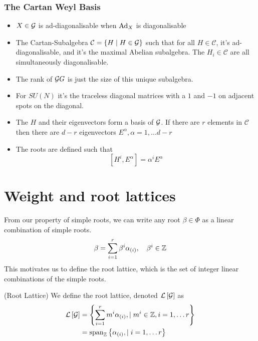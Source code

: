 \subsubsection{The Cartan Weyl Basis}
\begin{itemize}
	\item $ X \in \mathcal{ G } $ is ad-diagonalisable 
		when $ \text{Ad}_{ X } $ is diagonalisable 
	\item The Cartan-Subalgebra $ \mathcal{ C }  =  \left\{  H \mid H \in \mathcal{ G }   \right\} $ 
		such that for all $ H \in \mathcal{ C } $, it's ad-diagonalisable, and 
		it's the maximal Abelian subalgebra. The $ H _ i \in \mathcal{ C } $ 
		are all simultaneously diagonalisable. 
	\item The rank of $ \mathcal{ G } G $ is just the size of this unique subalgebra. 
	\item For $ SU \left(  N  \right)  $ it's the traceless diagonal matrices 
		with a $ 1 $ and $ -1 $ on adjacent spots on the diagonal.
	\item The $ H $ and their eigenvectors form a basis of $ \mathcal{ G } $. If there 
		are $ r $ elements in $ \mathcal{ C } $ then there 
		are $ d  - r $  eigenvectors $ E ^{ \alpha } , \alpha =  1, \dots d - r $
	\item The roots are defined such that 
		\[
			\left[  H ^{ i } , E ^{ \alpha }   \right]   = \alpha ^ i E ^{ \alpha } 
		\] 

\end{itemize}

 \pagebreak
\section{Weight and root lattices} 
From our property of simple roots, we can write any 
root $ \beta \in \Phi  $ as a linear combination of 
simple roots. 
\[
	\beta = \sum _{ i = 1 } ^ r \beta ^ i \alpha _{ \left( i  \right)  } , \quad 
	\beta ^ i \in \mathbb{Z} 
\] This motivates us to define the root lattice, 
which is the set of integer linear combinations of the 
simple roots. 
\begin{defn}{(Root Lattice)}
	We define the root lattice, denoted $ \mathcal{ L } \left[  \mathcal{ G }  \right]  $
	as 
	\begin{align*}
	 \mathcal{ L } \left[  \mathcal{ G }  \right] &=  \left\{  \sum_{ i= 1 } ^ r 
	 m ^ i \alpha _{ \left( i  \right)  } , \mid m ^ i \in \mathbb{Z} , i = 1 , \dots r \right\}   \\
					      &=  \text{span}_{ \mathbb{Z} } \left\{  \alpha _{ \left( i  \right)  } 
					       , \mid i = 1 , \dots r \right\} 
 \end{align*}
\end{defn}

